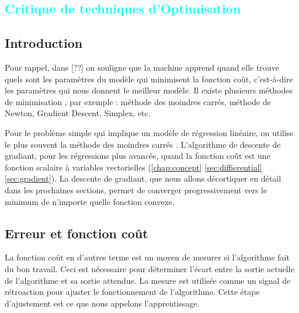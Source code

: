 			


%
%


\textcolor{cyan}{\chapter{Critique de techniques d'Optimisation }\label{chap:methode}}	

	\section{Introduction}
		Pour rappel, dans [??] on souligne que la machine apprend quand elle trouve quels sont les paramètres du modèle qui minimisent la fonction coût, c’est-à-dire les paramètres qui nous donnent le meilleur modèle. Il existe plusieurs méthodes de minimisation \cite{jtshiman:2021}, par exemple : méthode des moindres carrés, méthode de Newton, Gradient Descent, Simplex, etc.
		
		Pour le problème simple qui implique un modèle de régression linéaire, on utilise le plus souvent la méthode des moindres carrés \cite{darlington2016regression, matloff2017statistical}. L’algorithme de descente de gradiant, pour les régressions plus avancée, quand la fonction coût est une fonction scalaire à variables vectorielles (\cf \ref{chap:concept} \ref{sec:diffierential} \ref{sec:gradient}). La descente de gradiant, que nous allons décortiquer en détail dans les prochaines sections, permet de converger progressivement vers le minimum de n’importe quelle fonction convexe.
	
	 
	\section{Erreur et fonction coût}
		La fonction coût en d'autres terme est un moyen de mesurer si l'algorithme fait du bon travail. Ceci est nécessaire pour déterminer l'écart entre la sortie actuelle de l'algorithme et sa sortie attendue. La mesure est utilisée comme un signal de rétroaction pour ajuster le fonctionnement de l'algorithme. Cette étape d'ajustement est ce que nous appelons l'apprentissage.
		
